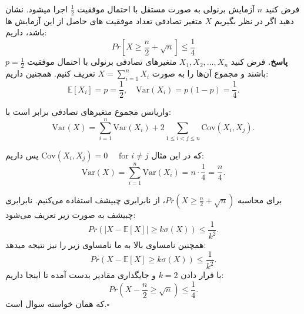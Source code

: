 \problem{}
فرض کنید $n$ آزمایش برنولی به صورت مستقل با احتمال موفقیت $\frac{1}{2}$
اجرا میشود.
نشان دهید اگر در نظر بگیریم $X$ متغیر تصادفی تعداد موفقیت های 
حاصل از این آزمایش ها باشد، داریم:\\
\[ Pr[X \geq \frac{n}{2} + \sqrt{n}] \leq \frac{1}{4}\]
\textbf{پاسخ.}
فرض کنید \( X_1, X_2, \ldots, X_n \) متغیرهای تصادفی برنولی با احتمال موفقیت \( p = \frac{1}{2} \) باشند و مجموع آن‌ها را به صورت \( X = \sum_{i=1}^n X_i \) تعریف کنیم. همچنین داریم:\\
\[
\mathbb{E}[X_i] = p = \frac{1}{2}, \quad \text{Var}(X_i) = p(1-p) = \frac{1}{4}.
\]


واریانس مجموع متغیرهای تصادفی برابر است با:
\[
\text{Var}(X) = \sum_{i=1}^n \text{Var}(X_i) + 2 \sum_{1 \leq i < j \leq n} \text{Cov}(X_i, X_j).
\]

که در این مثال $\text{Cov}(X_i, X_j) = 0 \quad \text{  for  } i \neq j$ پس داریم:\\
\[
\text{Var}(X) = \sum_{i=1}^n \text{Var}(X_i) = n \cdot \frac{1}{4} = \frac{n}{4}.
\]


برای محاسبه \( Pr\left(X \geq \frac{n}{2} + \sqrt{n}\right) \)، از نابرابری چبیشف استفاده می‌کنیم. نابرابری چبیشف به صورت زیر تعریف می‌شود:
\[
Pr(|X - \mathbb{E}[X]| \geq k\sigma(X)) \leq \frac{1}{k^2}.
\]
همچنین نامساوی بالا به ما نامساوی زیر را نیز نتیجه میدهد:\\
\[
Pr(X - \mathbb{E}[X] \geq k\sigma(X)) \leq \frac{1}{k^2}.
\]
با قرار دادن $k=2$ و جایگذاری مقادیر بدست آمده تا اینجا داریم:\\
\[
Pr(X - \frac{n}{2} \geq \sqrt{n}) \leq \frac{1}{4}.
\]
که همان خواسته سوال است.$\square$
